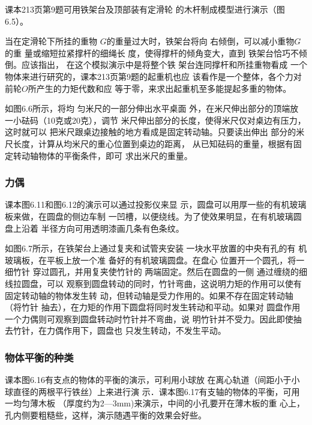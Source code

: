 课本213页第9题可用铁架台及顶部装有定滑轮
的木杆制成模型进行演示（图6.5）。


\begin{figure}[htp]
    \centering
    \caption{}
\end{figure}

当在定滑轮下所挂的重物
$G$的重量过大时，铁架台将向
右倾倒，可以减小重物$G$的重
量或缩短拉紧撑杆的细绳长
度，使得撑杆的倾角变大，直到
铁架台恰巧不倾倒。应该指出，
在这个模拟演示中是将整个铁
架台连同撑杆和所挂重物看成
一个物体来进行研究的，课本213页第9题的起重机也应
该看作是一个整体，各个力对前轮$O$所产生的力矩代数和应
等于零，来求出起重机至多能提起多重的物体。

\begin{figure}[htp]
    \centering
    \caption{}
\end{figure}

如图6.6所示，将均
匀米尺的一部分伸出水平桌面
外，在米尺伸出部分的顶端放
一小砝码（10克或20克），调节
米尺伸出部分的长度，使得米尺仅对桌边有压力，这时就可以
把米尺跟桌边接触的地方看成是固定转动轴。只要读出伸出
部分的米尺长度，计算从均米尺的重心位置到桌边的距离，
从已知砝码的重量，根据有固定转动轴物体的平衡条件，即可
求出米尺的重量。

\subsubsection{力偶}
课本图6.11和图6.12的演示可以通过投影仪来显
示，圆盘可以用厚一些的有机玻璃板来做，在圆盘的侧边车制
一凹槽，以便绕线。为了使效果明显，在有机玻璃圆盘上沿着
半径方向可用透明漆画几条有色条纹。

\begin{figure}[htp]
    \centering
    \caption{}
\end{figure}

如图6.7所示，在铁架台上通过复夹和试管夹安装
一块水平放置的中央有孔的有
机玻璃板，在平板上放一个准
备好的有机玻璃圆盘。在盘心
位置开一个圆孔，将一细竹针
穿过圆孔，并用复夹使竹针的
两端固定。然后在圆盘的一侧
通过缠绕的细线拉圆盘，可以
观察到圆盘转动的同时，竹针弯曲，这说明力矩的作用可以使有固定转动轴的物体发生转
动，但转动轴是受力作用的。如果不存在固定转动轴（将竹针
抽去），在力矩的作用下圆盘将同时发生转动和平动。如果对
圆盘作用一个力偶则可观察到圆盘转动时竹针并不弯曲，说
明竹针并不受力。因此即使抽去竹针，在力偶作用下，圆盘也
只发生转动，不发生平动。

\subsubsection{物体平衡的种类}
课本图6.16有支点的物体的平衡的演示，可利用小球放
在离心轨道（间距小于小球直径的两根平行铁丝）上来进行演
示．课本图6.17有支轴的物体的平衡，可用一均匀薄木板
（厚度约为2—3mm)来演示，中间的小孔要开在薄木板的重
心上，孔内侧要粗糙些，这样，演示随遇平衡的效果会好些。


